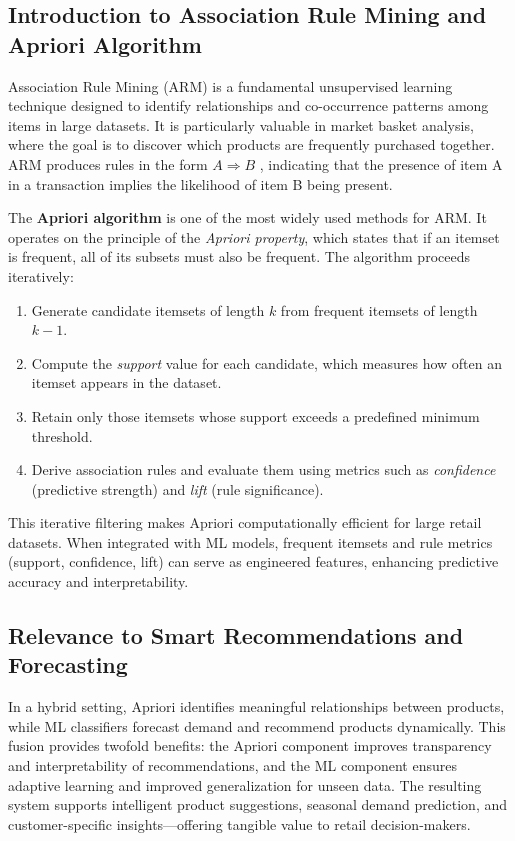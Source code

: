 \documentclass[twocolumn]{article}
\begin{document}
\subsection{Introduction to Association Rule Mining and Apriori Algorithm}

Association Rule Mining (ARM) is a fundamental unsupervised learning technique designed to identify relationships and co-occurrence patterns among items in large datasets. It is particularly valuable in market basket analysis, where the goal is to discover which products are frequently purchased together. ARM produces rules in the form \textit{$A \Rightarrow B$}
, indicating that the presence of item A in a transaction implies the likelihood of item B being present.

The \textbf{Apriori algorithm} is one of the most widely used methods for ARM. It operates on the principle of the \textit{Apriori property}, which states that if an itemset is frequent, all of its subsets must also be frequent. The algorithm proceeds iteratively:
\begin{enumerate}
    \item Generate candidate itemsets of length $k$ from frequent itemsets of length $k-1$.
    \item Compute the \textit{support} value for each candidate, which measures how often an itemset appears in the dataset.
    \item Retain only those itemsets whose support exceeds a predefined minimum threshold.
    \item Derive association rules and evaluate them using metrics such as \textit{confidence} (predictive strength) and \textit{lift} (rule significance).
\end{enumerate}
This iterative filtering makes Apriori computationally efficient for large retail datasets. When integrated with ML models, frequent itemsets and rule metrics (support, confidence, lift) can serve as engineered features, enhancing predictive accuracy and interpretability.

\subsection{Relevance to Smart Recommendations and Forecasting}

In a hybrid setting, Apriori identifies meaningful relationships between products, while ML classifiers forecast demand and recommend products dynamically. This fusion provides twofold benefits: the Apriori component improves transparency and interpretability of recommendations, and the ML component ensures adaptive learning and improved generalization for unseen data. The resulting system supports intelligent product suggestions, seasonal demand prediction, and customer-specific insights—offering tangible value to retail decision-makers.
\end{document}
